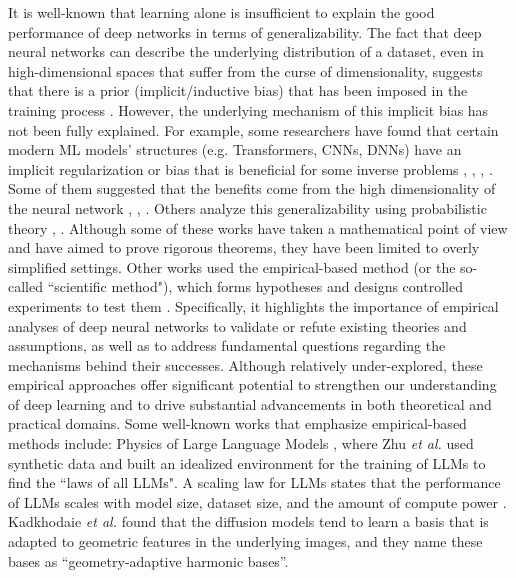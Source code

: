 \documentclass[lettersize,journal]{IEEEtran}
\begin{document}
It is well-known that learning alone is insufficient to explain the good performance of deep networks in terms of generalizability. The fact that deep neural networks can describe the underlying distribution of a dataset, even in high-dimensional spaces that suffer from the curse of dimensionality, suggests that there is a prior (implicit/inductive bias) that has been imposed in the training process \cite{Zahra}. However, the underlying mechanism of this implicit bias has not been fully explained. For example, some researchers have found that certain modern ML models' structures (e.g. Transformers, CNNs, DNNs) have an implicit regularization or bias that is beneficial for some inverse problems \cite{22}, \cite{ref49}, \cite{10.1145/3571070}, \cite{frei2022implicitbiasleakyrelu}. Some of them suggested that the benefits come from the high dimensionality of the neural network \cite{frei2022implicitbiasleakyrelu}, \cite{allenzhu2019convergencetheorydeeplearning}, \cite{arora2018optimizationdeepnetworksimplicit}. Others analyze this generalizability using probabilistic theory \cite{wilson2022bayesiandeeplearningprobabilistic}, \cite{griffiths2023bayesageintelligentmachines}. Although some of these works have taken a mathematical point of view and have aimed to prove rigorous theorems, they have been limited to overly simplified settings. Other works used the empirical-based method (or the so-called ``scientific method"), which forms hypotheses and designs controlled experiments to test them \cite{Physics_of_LLMS}. Specifically, it highlights the importance of empirical analyses of deep neural networks to validate or refute existing theories and assumptions, as well as to address fundamental questions regarding the mechanisms behind their successes. Although relatively under-explored, these empirical approaches offer significant potential to strengthen our understanding of deep learning and to drive substantial advancements in both theoretical and practical domains. Some well-known works that emphasize empirical-based methods include: Physics of Large Language Models \cite{Physics_of_LLMS}, where Zhu \textit{et al.} used synthetic data and built an idealized environment for the training of LLMs to find the ``laws of all LLMs". A scaling law for LLMs states that the performance of LLMs scales with model size, dataset size, and the amount of compute power \cite{kaplan2020scalinglawsneurallanguage}. Kadkhodaie \textit{et al.} \cite{Zahra} found that the diffusion models tend to learn a basis that is adapted to geometric features in the underlying images, and they name these bases as “geometry-adaptive harmonic bases”. 
\end{document}
